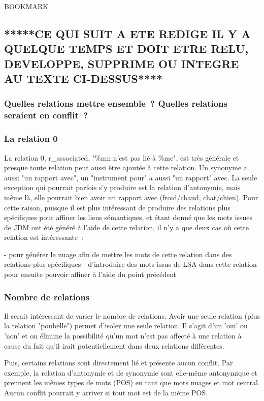\documentclass[a4paper,11pt,french]{article}
\begin{document}
BOOKMARK
\subsection{*****CE QUI SUIT A ETE REDIGE IL Y A QUELQUE TEMPS ET DOIT ETRE RELU, DEVELOPPE, SUPPRIME OU INTEGRE AU TEXTE CI-DESSUS****}

\subsubsection{Quelles relations mettre ensemble~? Quelles relations seraient en conflit~?}

\subsubsection{La relation 0}
La relation 0, r\_associated, "\%mn n'est pas lié à \%mc", est très générale et presque toute relation peut aussi être ajoutée à cette relation. Un synonyme a aussi "un rapport avec", un "instrument pour" a aussi "un rapport" avec. La seule exception qui pourrait parfois s'y produire est la relation d'antonymie, mais même là, elle pourrait bien avoir un rapport avec (froid/chaud, chat/chien). Pour cette raison, puisque il est plus intéressant de produire des relations plus spécifiques pour affiner les liens sémantiques, et étant donné que les mots issues de JDM ont été généré à l'aide de cette relation, il n'y a que deux cas où cette relation est intéressante~: 

- pour générer le nuage afin de mettre les mots de cette relation dans des relations plus spécifiques
- d'introduire des mots issus de LSA dans cette relation pour ensuite pouvoir affiner à l'aide du point précédent

\subsubsection{Nombre de relations}
Il serait intéressant de varier le nombre de relations. Avoir une seule relation (plus la relation "poubelle") permet d'isoler une seule relation. Il s'agit d'un 'oui' ou 'non' et on élimine la possibilité qu'un mot n'est pas affecté à une relation à cause du fait qu'il irait potentiellement dans deux relations différentes. 

Puis, certains relations sont directement lié et présente aucun conflit. Par exemple, la relation d'antonymie et de synonymie sont elle-même antonymique et prennent les mêmes types de mots (POS) en tant que mots nuages et mot central. Aucun conflit pourrait y arriver si tout mot est de la méme POS.  
\end{document}
